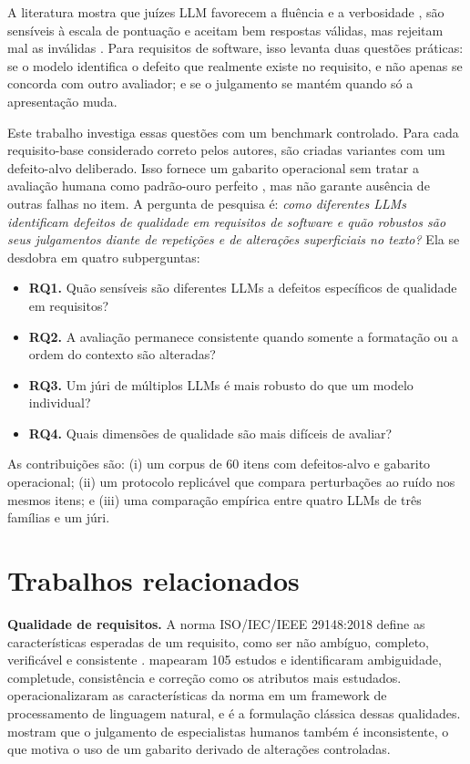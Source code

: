 \documentclass[12pt]{article}
\begin{document}
A literatura mostra que juízes LLM favorecem a fluência e a verbosidade \citep{zhou2024}, são sensíveis à escala de pontuação \citep{fujinuma2025} e aceitam bem respostas válidas, mas rejeitam mal as inválidas \citep{jain2025}. Para requisitos de software, isso levanta duas questões práticas: se o modelo identifica o defeito que realmente existe no requisito, e não apenas se concorda com outro avaliador; e se o julgamento se mantém quando só a apresentação muda.

Este trabalho investiga essas questões com um benchmark controlado. Para cada requisito-base considerado correto pelos autores, são criadas variantes com um defeito-alvo deliberado. Isso fornece um gabarito operacional sem tratar a avaliação humana como padrão-ouro perfeito \citep{nordin2017}, mas não garante ausência de outras falhas no item. A pergunta de pesquisa é: \emph{como diferentes LLMs identificam defeitos de qualidade em requisitos de software e quão robustos são seus julgamentos diante de repetições e de alterações superficiais no texto?} Ela se desdobra em quatro subperguntas:

\begin{itemize}
\item \textbf{RQ1.} Quão sensíveis são diferentes LLMs a defeitos específicos de qualidade em requisitos?
\item \textbf{RQ2.} A avaliação permanece consistente quando somente a formatação ou a ordem do contexto são alteradas?
\item \textbf{RQ3.} Um júri de múltiplos LLMs é mais robusto do que um modelo individual?
\item \textbf{RQ4.} Quais dimensões de qualidade são mais difíceis de avaliar?
\end{itemize}

As contribuições são: (i) um corpus de 60 itens com defeitos-alvo e gabarito operacional; (ii) um protocolo replicável que compara perturbações ao ruído nos mesmos itens; e (iii) uma comparação empírica entre quatro LLMs de três famílias e um júri.

\section{Trabalhos relacionados}

\textbf{Qualidade de requisitos.} A norma ISO/IEC/IEEE 29148:2018 define as características esperadas de um requisito, como ser não ambíguo, completo, verificável e consistente \citep{iso29148}. \citet{montgomery2022} mapearam 105 estudos e identificaram ambiguidade, completude, consistência e correção como os atributos mais estudados. \citet{sahu2024} operacionalizaram as características da norma em um framework de processamento de linguagem natural, e \citet{glinz2000} é a formulação clássica dessas qualidades. \citet{nordin2017} mostram que o julgamento de especialistas humanos também é inconsistente, o que motiva o uso de um gabarito derivado de alterações controladas.
\end{document}
